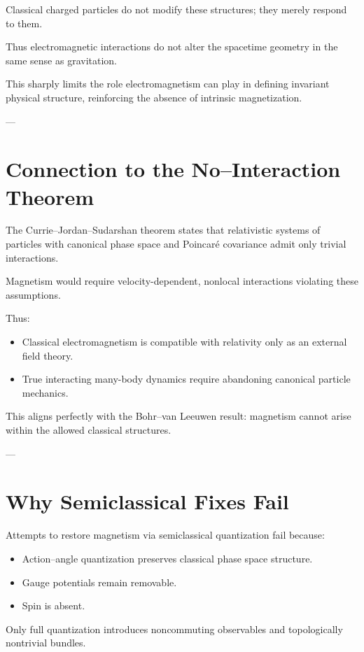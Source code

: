 \documentclass[11pt]{article}
\begin{document}
Classical charged particles do not modify these structures; they merely respond to them.

Thus electromagnetic interactions do not alter the spacetime geometry in the same sense as gravitation.

This sharply limits the role electromagnetism can play in defining invariant physical structure, reinforcing the absence of intrinsic magnetization.

---

\section{Connection to the No–Interaction Theorem}

The Currie–Jordan–Sudarshan theorem states that relativistic systems of particles with canonical phase space and Poincaré covariance admit only trivial interactions.

Magnetism would require velocity-dependent, nonlocal interactions violating these assumptions.

Thus:
\begin{itemize}
\item Classical electromagnetism is compatible with relativity only as an external field theory.
\item True interacting many-body dynamics require abandoning canonical particle mechanics.
\end{itemize}

This aligns perfectly with the Bohr–van Leeuwen result: magnetism cannot arise within the allowed classical structures.

---

\section{Why Semiclassical Fixes Fail}

Attempts to restore magnetism via semiclassical quantization fail because:

\begin{itemize}
\item Action–angle quantization preserves classical phase space structure.
\item Gauge potentials remain removable.
\item Spin is absent.
\end{itemize}

Only full quantization introduces noncommuting observables and topologically nontrivial bundles.
\end{document}
